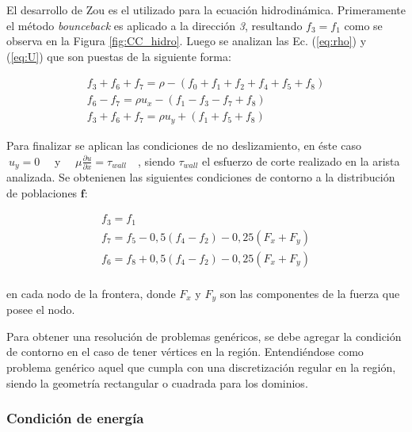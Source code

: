 El desarrollo de Zou \cite{zou1997pressure} es el utilizado para la ecuación hidrodinámica. Primeramente el método \textit{bounceback} es aplicado a la dirección \textit{3}, resultando $f_{3} = f_{1}$ como se observa en la Figura \ref{fig:CC_hidro}. Luego se analizan las Ec. (\ref{eq:rho}) y (\ref{eq:U}) que son puestas de la siguiente forma:

\begin{equation}
	\begin{array}{c}
	f_{3} + f_{6} + f_{7} = \rho - \left( f_{0} + f_{1} + f_{2} + f_{4} + f_{5} + f_{8}	 \right)\\
	f_{6} - f_{7} = \rho u_{x} - \left( f_{1} - f_{3} - f_{7} + f_{8} 	 \right)\\
	f_{3} + f_{6} + f_{7} = \rho u_{y} + \left( f_{1} + f_{5} + f_{8} \right)
	\end{array}
\end{equation}

Para finalizar se aplican las condiciones de no deslizamiento, en éste caso $\> u_{y} = 0\quad$ y $\quad\mu \frac{\partial u}{\partial x} = \tau_{wall}\quad$, siendo $\tau_{wall}$ el esfuerzo de corte realizado en la arista analizada. Se obtenienen las siguientes condiciones de contorno a la distribución de poblaciones $\mathbf{f}$:

\begin{equation}
\begin{array}{c}
f_{3} = f_{1}\\
f_{7} = f_{5} - 0,5 (f_{4} - f_{2}) - 0,25 (F_{x} + F_{y})\\
f_{6} = f_{8} + 0,5 (f_{4} - f_{2}) - 0,25 (F_{x} + F_{y})\\
\end{array}
\end{equation}

en cada nodo de la frontera, donde $F_{x}$ y  $F_{y}$ son las componentes de la fuerza que posee el nodo. 

Para obtener una resolución de problemas genéricos, se debe agregar la condición de contorno en el caso de tener vértices en la región. Entendiéndose como problema genérico aquel que cumpla con una discretización regular en la región, siendo la geometría rectangular o cuadrada para los dominios.

\subsubsection{Condición de energía}


